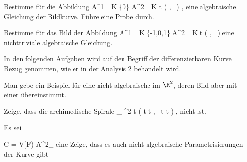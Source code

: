 {}
{





Bestimme für die Abbildung
\maabbeledisp {} { {\mathbb A}^{1}_{ K } \setminus \{0\}} { {\mathbb A}^{2}_{ K }
} { t } { \left(  {  }   , \,   {  }                   \right)
} {,}
eine algebraische Gleichung der Bildkurve. Führe eine Probe durch.





}
{} {}

{}
{





Bestimme für das Bild der Abbildung
\maabbeledisp {} { {\mathbb A}^{1}_{ K } \setminus \{-1,0,1\}} { {\mathbb A}^{2}_{ K }
} { t } { \left(  {  }   , \,   {  }                   \right)
} {}
eine nichttriviale algebraische Gleichung.





}
{} {}

In den folgenden Aufgaben wird auf den Begriff der differenzierbaren Kurve Bezug genommen, wie er in der Analysis 2 behandelt wird.

{}
{





Man gebe ein Beispiel für eine nicht-algebraische
 {} {}
im $\R^2$, deren Bild aber mit einer
übereinstimmt.





}
{} {}

{}
{





Zeige, dass die
 {} {}
archimedische Spirale
 {\R_{}} {\R^2
} { t } { \left( t \cos  t   , \,  t \sin  t                   \right)
} {,}
nicht
ist.





}
{} {}

{}
{





Es sei

\mavergleichskette
{\vergleichskette
{C
}
{ = }{ V(F)
}
{ \subset }{ {\mathbb A}^{2}_{\R}
}
{    }{
}
{   }{
}
}
{}{}{}
eine
Zeige, dass es auch nicht-algebraische
Parametrisierungen der Kurve gibt.





}
{} {}


